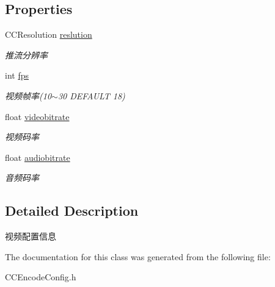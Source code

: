 \subsection*{Properties}
\begin{DoxyCompactItemize}
\item 
\mbox{\label{interface_c_c_encode_config_aad7d624f74b0da1ec29caa73307fed9f}} 
C\+C\+Resolution \hyperlink{interface_c_c_encode_config_aad7d624f74b0da1ec29caa73307fed9f}{reslution}
\begin{DoxyCompactList}\small\item\em 推流分辨率 \end{DoxyCompactList}\item 
\mbox{\label{interface_c_c_encode_config_ae5924fdda936660a9a9f948356ee729c}} 
int \hyperlink{interface_c_c_encode_config_ae5924fdda936660a9a9f948356ee729c}{fps}
\begin{DoxyCompactList}\small\item\em 视频帧率(10$\sim$30 D\+E\+F\+A\+U\+LT 18) \end{DoxyCompactList}\item 
\mbox{\label{interface_c_c_encode_config_aaf9a10439a6ae7d4f585115e38b556f7}} 
float \hyperlink{interface_c_c_encode_config_aaf9a10439a6ae7d4f585115e38b556f7}{videobitrate}
\begin{DoxyCompactList}\small\item\em 视频码率 \end{DoxyCompactList}\item 
\mbox{\label{interface_c_c_encode_config_a5e44d1d8d37e0a3e3234ab1c2e110955}} 
float \hyperlink{interface_c_c_encode_config_a5e44d1d8d37e0a3e3234ab1c2e110955}{audiobitrate}
\begin{DoxyCompactList}\small\item\em 音频码率 \end{DoxyCompactList}\end{DoxyCompactItemize}


\subsection{Detailed Description}
视频配置信息 

The documentation for this class was generated from the following file\+:\begin{DoxyCompactItemize}
\item 
C\+C\+Encode\+Config.\+h\end{DoxyCompactItemize}
